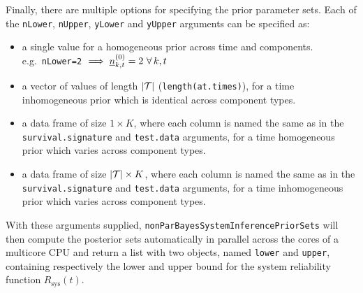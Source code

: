 \documentclass[12pt, a4paper]{elsarticle}
\newcommand{\Rsys}{R_\text{sys}}
\begin{document}
Finally, there are multiple options for specifying the prior parameter
sets.  Each of the \texttt{nLower}, \texttt{nUpper}, \texttt{yLower}
and \texttt{yUpper} arguments can be specified as:
\begin{itemize}
  \item a single value for a homogeneous prior across time and components.  e.g.\ \texttt{nLower=2} $\implies \underline{n}^{(0)}_{k,t}=2 \ \forall\,k, t$
  \item a vector of values of length $|{\cal T}|$ (\texttt{length(at.times)}), for a time inhomogeneous prior which is identical across component types.
  \item a data frame of size $1\times K$, where each column is named the same as in the \texttt{survival.signature} and \texttt{test.data} arguments, for a time homogeneous prior which varies across component types.
  \item a data frame of size $|{\cal T}|\times K$, where each column is named the same as in the \texttt{survival.signature} and \texttt{test.data} arguments, for a time inhomogeneous prior which varies across component types.
\end{itemize}

With these arguments supplied,  \texttt{nonParBayesSystemInferencePriorSets} will then compute
the posterior sets automatically in parallel across the cores of a
multicore CPU and return a list with two objects, named \texttt{lower} 
and \texttt{upper}, containing respectively the lower and upper bound 
for the system reliability function $\Rsys(t)$.
\end{document}

